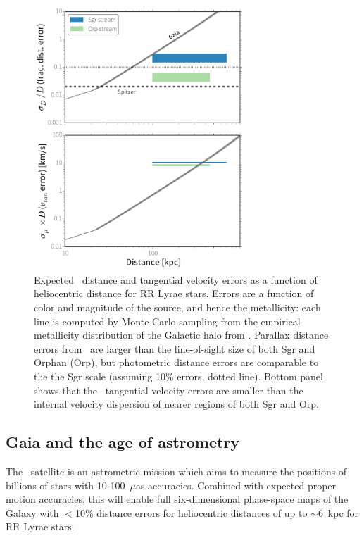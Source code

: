 \begin{figure}[hp!]
\begin{center}
\includegraphics[width=0.7\textwidth]{figures/ch1/fig1.pdf}

\caption{Expected \gaia\ distance and tangential velocity errors as a
function of heliocentric distance for RR Lyrae stars. Errors are a function of
color and magnitude of the source, and hence the metallicity: each line is
computed by Monte Carlo sampling from the empirical metallicity distribution of
the Galactic halo from \cite{ivezic08}. Parallax distance errors from \gaia\
are larger than the line-of-sight size of both Sgr and Orphan (Orp), but
photometric distance errors are comparable to the the Sgr scale (assuming 10\%
errors, dotted line). Bottom panel shows that the \gaia\ tangential velocity
errors are smaller than the internal velocity dispersion of nearer regions of
both Sgr and Orp. }\label{fig:gaia_errors}
\end{center}
\end{figure}

\subsection{Gaia and the age of astrometry}
\label{sec:ch2-gaia}
The \gaia\ satellite \citep{gaia01} is an astrometric mission which aims to
measure the positions of billions of stars with 10-100~$\mu$as accuracies.
Combined with expected proper motion accuracies, this will enable full
six-dimensional phase-space maps of the Galaxy with $<$10\% distance errors for
heliocentric distances of up to $\sim$6~kpc for RR Lyrae stars.


